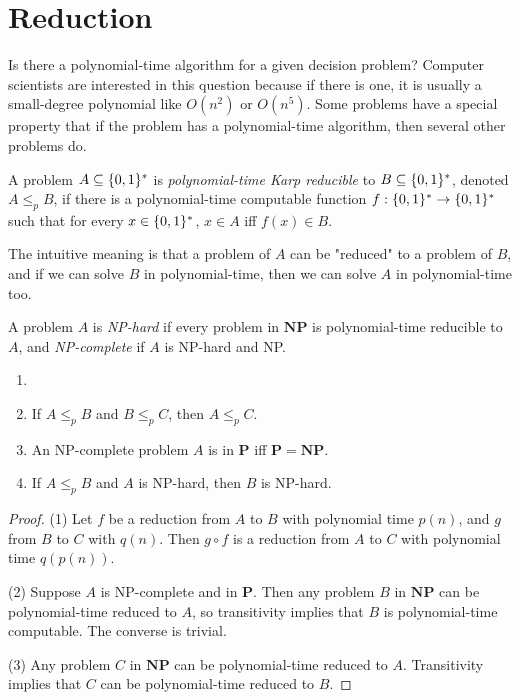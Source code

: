    \section {Reduction}
    Is there a polynomial-time algorithm for a given decision problem? Computer scientists are interested in this question because if there is one, it is usually a small-degree polynomial like $O(n^2)$ or $O(n^5)$. Some problems have a special property that if the problem has a polynomial-time algorithm, then several other problems do.
        
    \begin{defn} \label{def_poly_karp}
        A problem $A \subseteq \{0,1\}^\ast$ is \emph{polynomial-time Karp reducible} to $B \subseteq \{0,1\}^\ast$, denoted $A \leq_p B$, if there is a polynomial-time computable function $f: \{0,1\}^\ast \rightarrow \{0,1\}^\ast$ such that for every $x \in \{0,1\}^\ast$, $x \in A$ iff $f(x) \in B$.
    \end{defn}
        
    The intuitive meaning is that a problem of $A$ can be "reduced" to a problem of $B$, and if we can solve $B$ in polynomial-time, then we can solve $A$ in polynomial-time too.
        
    \begin{defn}[NP-complete] \label{def_npc}
        A problem $A$ is \emph{NP-hard} if every problem in $\mathbf{NP}$ is polynomial-time reducible to $A$, and \emph{NP-complete} if $A$ is NP-hard and NP.
    \end{defn}
        
    \begin{thm} \label{thm_leqp_transitive}
        \begin{enumerate}
            \item[]
            \item If $A \leq_p B$ and $B \leq_p C$, then $A \leq_p C$.
            \item An NP-complete problem $A$ is in $\mathbf{P}$ iff $\mathbf{P}=\mathbf{NP}$.
            \item If $A \leq_p B$ and $A$ is NP-hard, then $B$ is NP-hard.
        \end{enumerate}
    \end{thm}
        
    \begin{proof}
        (1) Let $f$ be a reduction from $A$ to $B$ with polynomial time $p(n)$, and $g$ from $B$ to $C$ with $q(n)$. Then $g \circ f$ is a reduction from $A$ to $C$ with polynomial time $q(p(n))$.
            
        (2) Suppose $A$ is NP-complete and in $\mathbf{P}$. Then any problem $B$ in $\mathbf{NP}$ can be polynomial-time reduced to $A$, so transitivity implies that $B$ is polynomial-time computable. The converse is trivial.
            
        (3) Any problem $C$ in $\mathbf{NP}$ can be polynomial-time reduced to $A$. Transitivity implies that $C$ can be polynomial-time reduced to $B$.
    \end{proof}
        
